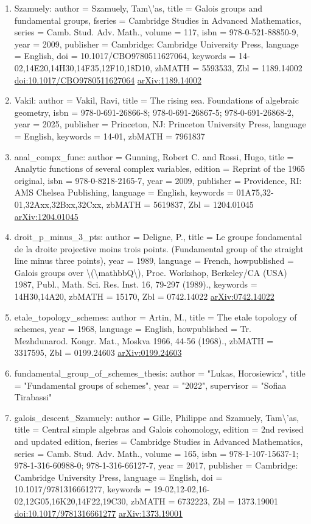 \documentclass[11pt]{article}
\begin{document}
\begin{enumerate}[leftmargin=*]
  \item Szamuely: author = Szamuely, Tam\textbackslash{}'as, title = Galois groups and fundamental groups, fseries = Cambridge Studies in Advanced Mathematics, series = Camb. Stud. Adv. Math., volume = 117, isbn = 978-0-521-88850-9, year = 2009, publisher = Cambridge: Cambridge University Press, language = English, doi = 10.1017/CBO9780511627064, keywords = 14-02,14E20,14H30,14F35,12F10,18D10, zbMATH = 5593533, Zbl = 1189.14002 \href{https://doi.org/10.1017/CBO9780511627064}{doi:10.1017/CBO9780511627064} \href{https://arxiv.org/abs/1189.14002}{arXiv:1189.14002}
  \item Vakil: author = Vakil, Ravi, title = The rising sea. Foundations of algebraic geometry, isbn = 978-0-691-26866-8; 978-0-691-26867-5; 978-0-691-26868-2, year = 2025, publisher = Princeton, NJ: Princeton University Press, language = English, keywords = 14-01, zbMATH = 7961837
  \item anal\_compx\_func: author = Gunning, Robert C. and Rossi, Hugo, title = Analytic functions of several complex variables, edition = Reprint of the 1965 original, isbn = 978-0-8218-2165-7, year = 2009, publisher = Providence, RI: AMS Chelsea Publishing, language = English, keywords = 01A75,32-01,32Axx,32Bxx,32Cxx, zbMATH = 5619837, Zbl = 1204.01045 \href{https://arxiv.org/abs/1204.01045}{arXiv:1204.01045}
  \item droit\_p\_minus\_3\_pts: author = Deligne, P., title = Le groupe fondamental de la droite projective moins trois points. (Fundamental group of the straight line minus three points), year = 1989, language = French, howpublished = Galois groups over \textbackslash{}(\textbackslash{}mathbbQ\textbackslash{}), Proc. Workshop, Berkeley/CA (USA) 1987, Publ., Math. Sci. Res. Inst. 16, 79-297 (1989)., keywords = 14H30,14A20, zbMATH = 15170, Zbl = 0742.14022 \href{https://arxiv.org/abs/0742.14022}{arXiv:0742.14022}
  \item etale\_topology\_schemes: author = Artin, M., title = The etale topology of schemes, year = 1968, language = English, howpublished = Tr. Mezhdunarod. Kongr. Mat., Moskva 1966, 44-56 (1968)., zbMATH = 3317595, Zbl = 0199.24603 \href{https://arxiv.org/abs/0199.24603}{arXiv:0199.24603}
  \item fundamental\_group\_of\_schemes\_thesis: author = "Lukas, Horosiewicz", title = "Fundamental groups of schemes", year = "2022", supervisor = "Sofiaa Tirabassi"
  \item galois\_descent\_Szamuely: author = Gille, Philippe and Szamuely, Tam\textbackslash{}'as, title = Central simple algebras and Galois cohomology, edition = 2nd revised and updated edition, fseries = Cambridge Studies in Advanced Mathematics, series = Camb. Stud. Adv. Math., volume = 165, isbn = 978-1-107-15637-1; 978-1-316-60988-0; 978-1-316-66127-7, year = 2017, publisher = Cambridge: Cambridge University Press, language = English, doi = 10.1017/9781316661277, keywords = 19-02,12-02,16-02,12G05,16K20,14F22,19C30, zbMATH = 6732223, Zbl = 1373.19001 \href{https://doi.org/10.1017/9781316661277}{doi:10.1017/9781316661277} \href{https://arxiv.org/abs/1373.19001}{arXiv:1373.19001}

\end{enumerate}
\end{document}
